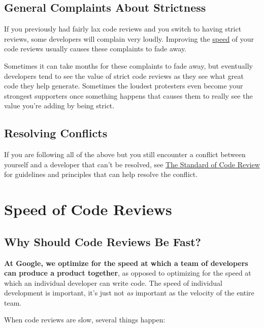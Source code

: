 \documentclass[
]{article}
\begin{document}
\subsection{General Complaints About Strictness}\label{strictness}

If you previously had fairly lax code reviews and you switch to having
strict reviews, some developers will complain very loudly. Improving the
\href{speed.md}{speed} of your code reviews usually causes these
complaints to fade away.

Sometimes it can take months for these complaints to fade away, but
eventually developers tend to see the value of strict code reviews as
they see what great code they help generate. Sometimes the loudest
protesters even become your strongest supporters once something happens
that causes them to really see the value you're adding by being strict.

\subsection{Resolving Conflicts}\label{conflicts}

If you are following all of the above but you still encounter a conflict
between yourself and a developer that can't be resolved, see
\href{standard.md}{The Standard of Code Review} for guidelines and
principles that can help resolve the conflict.

\section{Speed of Code Reviews}\label{speed-of-code-reviews}

\subsection{Why Should Code Reviews Be Fast?}\label{why}

\textbf{At Google, we optimize for the speed at which a team of
developers can produce a product together}, as opposed to optimizing for
the speed at which an individual developer can write code. The speed of
individual development is important, it's just not \emph{as} important
as the velocity of the entire team.

When code reviews are slow, several things happen:
\end{document}
